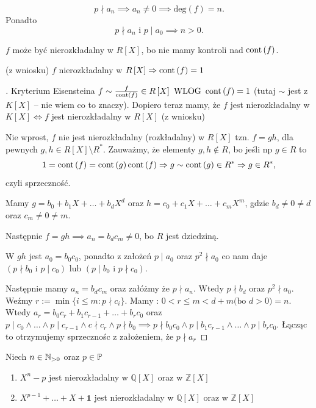 \begin{remark}
	\[
	p\nmid a_{n} \implies a_{n} \neq 0 \implies \text{deg}(f) = n
	.\] 
	Ponadto
	\[
	p\nmid a_{n} \text{ i } p\mid a_0 \implies n>0
	.\] 
\end{remark} 
\begin{remark}
	$f$ może być nierozkładalny w $R\left[ X \right] $, bo nie mamy kontroli nad $\operatorname{cont} \left( f \right) $.

	\noindent (z wniosku) $f$ nierozkładalny w $R\left[ X \right] \Rightarrow \operatorname{cont} \left( f \right) = 1$
\end{remark} 
\begin{proof}[]Kryterium Eisensteina
	$f\sim \frac{f}{\operatorname{cont} \left( f \right) } \in R\left[ X \right] \text{ WLOG } \operatorname{cont} \left( f \right) = 1  $ (tutaj $\sim$ jest z $K\left[ X \right]$ -- nie wiem co to znaczy). Dopiero teraz mamy, że $f$ jest nierozkładalny w $K\left[ X \right] \iff f$ jest nierozkładalny w $R\left[ X \right] $ (z wniosku)

	Nie wprost, $f $ nie jest nierozkładalny (rozkładalny) w $R\left[ X \right] $ tzn. $f = gh$, dla pewnych $g,h \in R\left[ X \right] \setminus R^{\ast} $. Zauważmy, że elementy $g,h \not\in R$, bo jeśli np $g\in R$ to \[
	1 = \operatorname{cont} \left( f \right) = \operatorname{cont} \left( g \right) \operatorname{cont} \left( f \right) \Rightarrow g\sim \operatorname{cont} \left( g \right) \in R^{\ast} \Rightarrow g \in R^{\ast}  
       ,\]
       czyli sprzeczność.

Mamy $g = b_0 + b_1X + \ldots + b_{d}X^{d}$ oraz $h = c_0 + c_1X + \ldots + c_{m}X^{m}$, gdzie $b_{d} \neq 0 \neq d$ oraz $c_{m} \neq 0 \neq m$.

Następnie $f = gh \implies a_{n} = b_{d}c_{m} \neq 0$, bo $R$ jest dziedziną.

W $gh$ jest  $a_0 = b_0c_0$, ponadto z założeń $p\mid a_0$ oraz $p^2 \nmid a_0$ co nam daje $\left( p\nmid b_0 \text{ i } p\mid c_0 \right) $ lub $\left( p\mid b_0 \text{ i } p \nmid c_0 \right) $.

Następnie mamy $a_{n} = b_{d}c_{m}$ oraz załóżmy że $p\nmid a_{n} $. Wtedy $p\nmid b_{d} $ oraz $p^2 \nmid a_0$. Weźmy $r := \min \{i\le m : p\nmid c_{i}\} $. Mamy : $0<r \le m < d+m \text{(bo $d>0$)} = n$. Wtedy $a_{r} = b_0c_{r} + b_1c_{r-1} + \ldots + b_{r}c_0$ oraz $p\mid c_0 \land \ldots\land p\mid c_{r-1} \land c \nmid c_{r} \land p\nmid b_0 \implies p\nmid b_0c_0 \land p\mid b_1c_{r-1} \land \ldots \land p \mid b_{r}c_0$. Łącząc to otrzymujemy sprzecznośc z założeniem, że $p \nmid a_{r}$
\end{proof} 
\begin{eg}
	Niech $n \in \mathbb{N}_{>0}$ oraz $p\in \mathbb{P}$
	\begin{enumerate}[label=\arabic*)]
		\item $X^{n}-p$ jest nierozkładalny w $\mathbb{Q} \left[ X \right] $ oraz w $\mathbb{Z} \left[ X \right] $
		\item $X^{p-1} + \ldots + X + \mathbf{1}$ jest nierozkładalny w $\mathbb{Q} \left[ X \right] $ oraz w $\mathbb{Z} \left[ X \right] $
	\end{enumerate}
\end{eg} 

